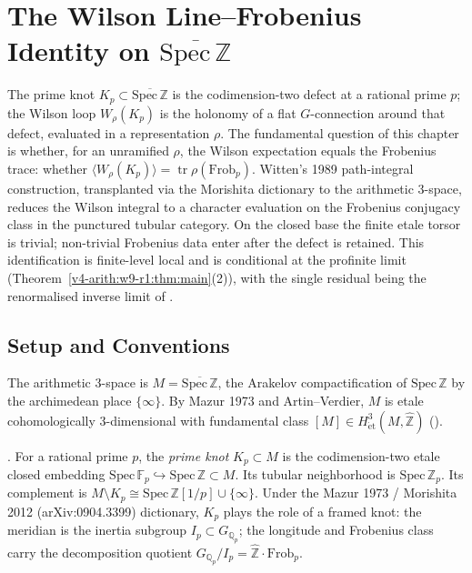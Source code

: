 \chapter{The Wilson Line--Frobenius Identity on
\texorpdfstring{\(\overline{\mathrm{Spec}\,\mathbb Z}\)}{Spec Z bar}}
\label{v4-arith:w9-r1:wilson-frobenius}

The prime knot \(K_{p}\subset\overline{\mathrm{Spec}\,\mathbb Z}\) is the
codimension-two defect at a rational prime \(p\); the Wilson loop
\(W_{\rho}(K_{p})\) is the holonomy of a flat \(G\)-connection around
that defect, evaluated in a representation \(\rho\). The fundamental
question of this chapter is whether, for an unramified \(\rho\), the
Wilson expectation equals the Frobenius trace: whether
\(\langle W_{\rho}(K_{p})\rangle = \operatorname{tr}\rho(\mathrm{Frob}_{p})\).
Witten's 1989 path-integral construction, transplanted via the Morishita
dictionary to the arithmetic 3-space, reduces the Wilson integral to a
character evaluation on the Frobenius conjugacy class in the punctured
tubular category. On the closed base the finite etale torsor is trivial;
non-trivial Frobenius data enter after the defect is retained. This
identification is finite-level local and is conditional at the profinite limit
(Theorem~\ref{v4-arith:w9-r1:thm:main}(2)), with the single residual
being the renormalised inverse limit of
.

\section{Setup and Conventions}
\label{v4-arith:w9-r1:setup}

The arithmetic 3-space is
\(M=\overline{\mathrm{Spec}\,\mathbb Z}\), the Arakelov compactification
of \(\mathrm{Spec}\,\mathbb Z\) by the archimedean place
\(\{\infty\}\). By Mazur 1973 and Artin--Verdier, \(M\) is etale
cohomologically 3-dimensional with fundamental class \([M]\in
H^{3}_{\mathrm{\acute et}}(M,\widehat{\mathbb Z})\)
().

\begin{definition}
\label{v4-arith:w9-r1:def:prime-knot}
\ClaimStatusDefinitional. For a rational prime \(p\), the \emph{prime
knot} \(K_{p}\subset M\) is the codimension-two etale closed embedding
\(\mathrm{Spec}\,\mathbb F_{p}\hookrightarrow
\mathrm{Spec}\,\mathbb Z\subset M\). Its tubular neighborhood is
\(\mathrm{Spec}\,\mathbb Z_{p}\). Its complement is
\(M\setminus K_{p}\cong
\mathrm{Spec}\,\mathbb Z[1/p]\cup\{\infty\}\). Under the Mazur 1973 /
Morishita 2012 (arXiv:0904.3399) dictionary, \(K_{p}\) plays the role of
a framed knot: the meridian is the inertia subgroup
\(I_{p}\subset G_{\mathbb Q_{p}}\); the longitude and Frobenius class
carry the decomposition quotient
\(G_{\mathbb Q_{p}}/I_{p}=\widehat{\mathbb Z}\cdot\mathrm{Frob}_{p}\).
\end{definition}

